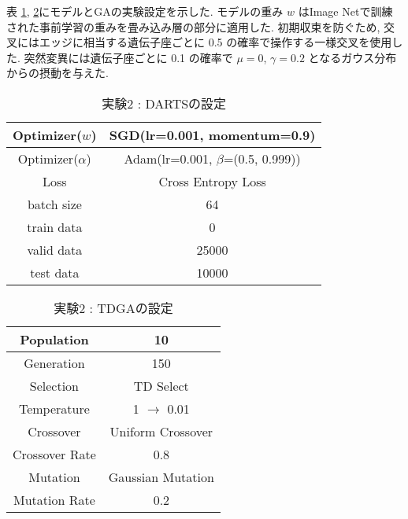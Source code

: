 表 \ref{tab:setting_darts}, \ref{tab:setting_ga}にモデルとGAの実験設定を示した.
モデルの重み $w$ はImage Netで訓練された事前学習の重みを畳み込み層の部分に適用した.
初期収束を防ぐため, 交叉にはエッジに相当する遺伝子座ごとに 0.5 の確率で操作する一様交叉を使用した.
突然変異には遺伝子座ごとに 0.1 の確率で $\mu=0$, $\gamma=0.2$ となるガウス分布からの摂動を与えた.


\begin{table}[t]
  \begin{center}
    \caption{実験2 : DARTSの設定}
  	\vspace{3mm}
    \begin{tabular}{|c|c|} \hline
      Optimizer($w$) & SGD(lr=0.001, momentum=0.9) \\ \hline
      Optimizer($\alpha$) & Adam(lr=0.001, $\beta$=(0.5, 0.999)) \\ \hline
      Loss & Cross Entropy Loss \\ \hline
      batch size & 64 \\ \hline
      train data & 0\\ \hline
      valid data & 25000\\ \hline
      test data &  10000\\ \hline
    \end{tabular}
    \label{tab:setting_darts}
  \end{center}
\end{table}

\begin{table}[t]
  \begin{center}
    \caption{実験2 : TDGAの設定}
  	\vspace{3mm}
    \begin{tabular}{|c|c|} \hline
      Population & 10 \\ \hline
      Generation & 150 \\ \hline \hline
      Selection & TD Select \\ \hline
      Temperature & 1 $\rightarrow$ 0.01 \\ \hline \hline
      Crossover & Uniform Crossover \\ \hline
      Crossover Rate & 0.8 \\ \hline \hline
      Mutation & Gaussian Mutation \\ \hline
      Mutation Rate & 0.2 \\ \hline
    \end{tabular}
    \label{tab:setting_ga}
  \end{center}
\end{table}
